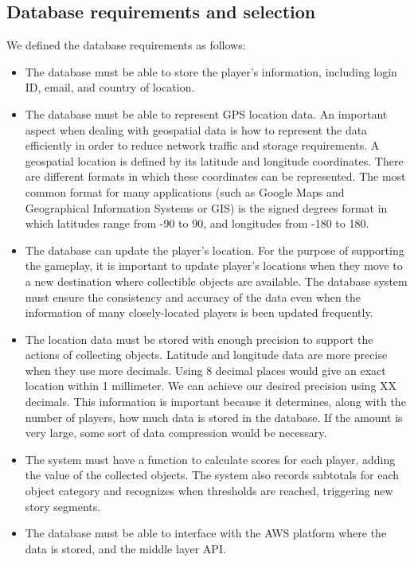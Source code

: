 \documentclass[conference]{IEEEtran}
\begin{document}
\subsection{Database requirements and selection}

We defined the database requirements as follows:

\begin{itemize}

\item The database must be able to store the player’s information, including login ID, email, and country of location.
\item The database must be able to represent GPS location data. An important aspect when dealing with geospatial data is how to represent the data efficiently in order to reduce network traffic and storage requirements. A geospatial location is defined by its latitude and longitude coordinates. There are different formats in which these coordinates can be represented. The most common format for many applications (such as Google Maps and Geographical Information Systems or GIS) is the signed degrees format in which latitudes range from -90 to 90, and longitudes from -180 to 180.
\item The database can update the player's location. For the purpose of supporting the gameplay, it is important to update player’s locations when they move to a new destination where collectible objects are available. The database system must ensure the consistency and accuracy of the data even when the information of many closely-located players is been updated frequently. 
\item The location data must be stored with enough precision to support the actions of collecting objects. Latitude and longitude data are more precise when they use more decimals. Using 8 decimal places would give an exact location within 1 millimeter. We can achieve our desired precision using XX decimals. This information is important because it determines, along with the number of players, how much data is stored in the database. If the amount is very large, some sort of data compression would be necessary.
\item The system must have a function to calculate scores for each player, adding the value of the collected objects. The system also records subtotals for each object category and recognizes when thresholds are reached, triggering new story segments.
\item The database must be able to interface with the AWS platform where the data is stored, and the middle layer API.

\end{itemize}
\end{document}
